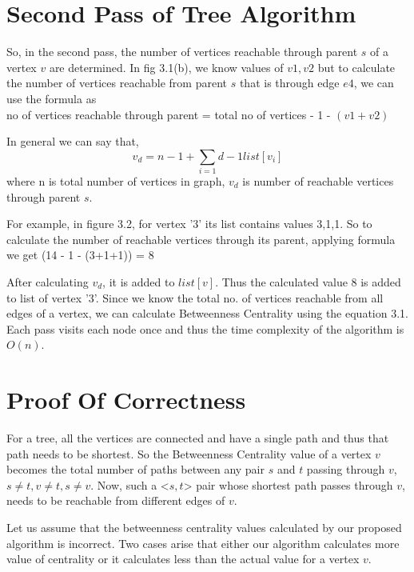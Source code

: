 \section{Second Pass of Tree Algorithm}
\vspace{-1.0em}
So, in the second pass, the number of vertices reachable through parent $s$ of a vertex $v$ are determined.
In fig 3.1(b), we know values of $v1,v2$ but to calculate the number of vertices reachable from parent $s$ that is through edge $e4$, we can use the formula as
\\
no of vertices reachable through parent = total no of vertices - 1 - $(v1 + v2)$

In general we can say that,
\begin{equation} \label{eq5}
v_{d} = n - 1 + \sum_{i=1}{d-1} list[v_{i}]
\end{equation}
where n is total number of vertices in graph, $v_{d}$ is number of reachable vertices through parent $s$.

For example, in figure 3.2, for vertex '3' its list contains values 3,1,1. So to calculate the number of reachable vertices through its parent, applying formula we get (14 - 1 - (3+1+1)) = 8 

After calculating $v_{d}$, it is added to $list[v]$.
Thus the calculated value 8 is added to list of vertex '3'.
Since we know the total no. of vertices reachable from all edges of a vertex, we can calculate Betweenness Centrality using the equation 3.1.
\\
Each pass visits each node once and thus the time complexity of the algorithm is $O(n)$.


\section{Proof Of Correctness}

For a tree, all the vertices are connected and have a single path and thus that path needs to be shortest. So the Betweenness Centrality value of a vertex $v$ becomes the total number of paths between any pair $s$ and $t$ passing through $v$, $s \neq t, v\neq t, s\neq v$. Now, such a <$s,t$> pair whose shortest path passes through $v$, needs to be reachable from different edges of $v$. 

Let us assume that the betweenness centrality values calculated by our proposed algorithm is incorrect. Two cases arise that either our algorithm calculates more value of centrality or it calculates less than the actual value for a vertex $v$.

